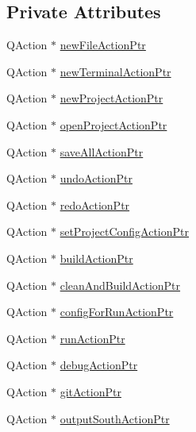 \subsection*{Private Attributes}
\begin{DoxyCompactItemize}
\item 
Q\-Action $\ast$ \hyperlink{class_master_actions_a4da658e527460b8d5b0a263820259e97}{new\-File\-Action\-Ptr}
\item 
Q\-Action $\ast$ \hyperlink{class_master_actions_a6c3b1d9319fbf23f5a7cbe8305e16fc1}{new\-Terminal\-Action\-Ptr}
\item 
Q\-Action $\ast$ \hyperlink{class_master_actions_a114ab55c27fc183af68ebaaa86748a82}{new\-Project\-Action\-Ptr}
\item 
Q\-Action $\ast$ \hyperlink{class_master_actions_a3b4d98cdbfaa8e287d420513a8df53ee}{open\-Project\-Action\-Ptr}
\item 
Q\-Action $\ast$ \hyperlink{class_master_actions_a4e9bf6410023b508d56f235903a44b5f}{save\-All\-Action\-Ptr}
\item 
Q\-Action $\ast$ \hyperlink{class_master_actions_a23386959a2f60a89cc6ae1bff012c76c}{undo\-Action\-Ptr}
\item 
Q\-Action $\ast$ \hyperlink{class_master_actions_a7936a9bf0e7418cd864b2fb1ab786d09}{redo\-Action\-Ptr}
\item 
Q\-Action $\ast$ \hyperlink{class_master_actions_abe52f232f77f5a5bff35c8e3dadb3d80}{set\-Project\-Config\-Action\-Ptr}
\item 
Q\-Action $\ast$ \hyperlink{class_master_actions_a627d91b89d122dd27addc931d1c91ca0}{build\-Action\-Ptr}
\item 
Q\-Action $\ast$ \hyperlink{class_master_actions_a2c0f332975bec2424d4af212ab566c5a}{clean\-And\-Build\-Action\-Ptr}
\item 
Q\-Action $\ast$ \hyperlink{class_master_actions_acd6548d1110ae426f384bfeb6acc9c1f}{config\-For\-Run\-Action\-Ptr}
\item 
Q\-Action $\ast$ \hyperlink{class_master_actions_a3377fe0ddc45ce50119766c8a903c039}{run\-Action\-Ptr}
\item 
Q\-Action $\ast$ \hyperlink{class_master_actions_ae37993bbbed4a238ea3b11089ac46a61}{debug\-Action\-Ptr}
\item 
Q\-Action $\ast$ \hyperlink{class_master_actions_ac9e25741cf358793122b687e82f7bb85}{git\-Action\-Ptr}
\item 
Q\-Action $\ast$ \hyperlink{class_master_actions_a5b7a85c6728274eb0fcb48924044b9f6}{output\-South\-Action\-Ptr}
\item 

\end{DoxyCompactItemize}
